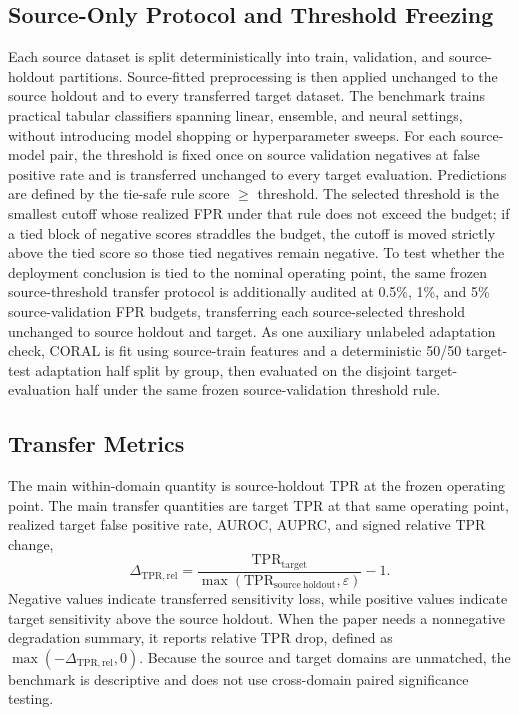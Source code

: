 \documentclass[preprint,12pt]{elsarticle}
\begin{document}
\subsection{Source-Only Protocol and Threshold Freezing}

Each source dataset is split deterministically into train, validation, and source-holdout partitions. Source-fitted preprocessing is then applied unchanged to the source holdout and to every transferred target dataset. The benchmark trains \ModelCount{} practical tabular classifiers spanning linear, ensemble, and neural settings, without introducing model shopping or hyperparameter sweeps. For each source-model pair, the threshold is fixed once on source validation negatives at \FrozenFprTarget{} false positive rate and is transferred unchanged to every target evaluation. Predictions are defined by the tie-safe rule score $\geq$ threshold. The selected threshold is the smallest cutoff whose realized FPR under that rule does not exceed the budget; if a tied block of negative scores straddles the budget, the cutoff is moved strictly above the tied score so those tied negatives remain negative. To test whether the deployment conclusion is tied to the nominal operating point, the same frozen source-threshold transfer protocol is additionally audited at 0.5\%, 1\%, and 5\% source-validation FPR budgets, transferring each source-selected threshold unchanged to source holdout and target. As one auxiliary unlabeled adaptation check, CORAL is fit using source-train features and a deterministic 50/50 target-test adaptation half split by group, then evaluated on the disjoint target-evaluation half under the same frozen \FrozenFprTarget{} source-validation threshold rule.

\subsection{Transfer Metrics}

The main within-domain quantity is source-holdout TPR at the frozen operating point. The main transfer quantities are target TPR at that same operating point, realized target false positive rate, AUROC, AUPRC, and signed relative TPR change,
\[
\Delta_{\mathrm{TPR,rel}} = \frac{\mathrm{TPR}_{\mathrm{target}}}{\max(\mathrm{TPR}_{\mathrm{source\ holdout}}, \varepsilon)} - 1.
\]
Negative values indicate transferred sensitivity loss, while positive values indicate target sensitivity above the source holdout. When the paper needs a nonnegative degradation summary, it reports relative TPR drop, defined as $\max(-\Delta_{\mathrm{TPR,rel}}, 0)$. Because the source and target domains are unmatched, the benchmark is descriptive and does not use cross-domain paired significance testing.
\end{document}
